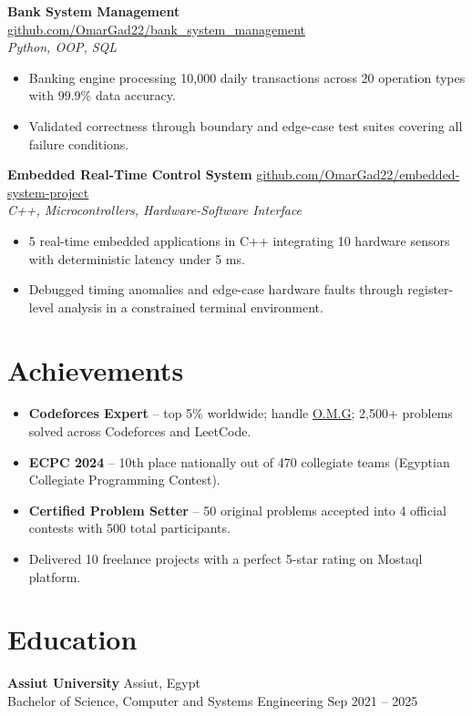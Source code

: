 \documentclass[letterpaper,10pt]{article}
\begin{document}
\vspace{3pt}
\textbf{Bank System Management} \hfill \href{https://github.com/OmarGad22/bank_system_management}{github.com/OmarGad22/bank\_system\_management}\\
\textit{Python, OOP, SQL}
\begin{itemize}
  \item Banking engine processing 10,000 daily transactions across 20 operation types with 99.9\% data accuracy.
  \item Validated correctness through boundary and edge-case test suites covering all failure conditions.
\end{itemize}

\vspace{3pt}
\textbf{Embedded Real-Time Control System} \hfill \href{https://github.com/OmarGad22/embedded-system-project}{github.com/OmarGad22/embedded-system-project}\\
\textit{C++, Microcontrollers, Hardware-Software Interface}
\begin{itemize}
  \item 5 real-time embedded applications in C++ integrating 10 hardware sensors with deterministic latency under 5 ms.
  \item Debugged timing anomalies and edge-case hardware faults through register-level analysis in a constrained terminal environment.
\end{itemize}

\section{Achievements}

\begin{itemize}
  \item \textbf{Codeforces Expert} -- top 5\% worldwide; handle \href{https://codeforces.com/profile/O.M.G}{O.M.G}; 2,500+ problems solved across Codeforces and LeetCode.
  \item \textbf{ECPC 2024} -- 10th place nationally out of 470 collegiate teams (Egyptian Collegiate Programming Contest).
  \item \textbf{Certified Problem Setter} -- 50 original problems accepted into 4 official contests with 500 total participants.
  \item Delivered 10 freelance projects with a perfect 5-star rating on Mostaql platform.
\end{itemize}

\section{Education}

\textbf{Assiut University} \hfill Assiut, Egypt\\
Bachelor of Science, Computer and Systems Engineering \hfill Sep 2021 -- 2025
\end{document}
